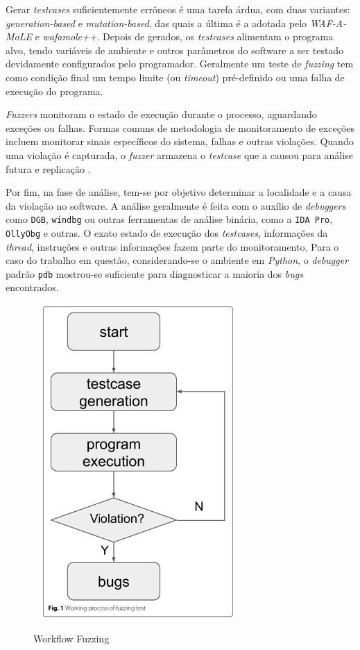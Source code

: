 Gerar \textit{testcases} suficientemente errôneos é uma tarefa árdua, com duas variantes: \textit{generation-based} e \textit{mutation-based}, das quais a última é a adotada pelo \textit{WAF-A-MoLE} e \textit{wafamole++}. Depois de gerados, os \textit{testcases} alimentam o programa alvo, tendo variáveis de ambiente e outros parâmetros do software a ser testado devidamente configurados pelo programador. Geralmente um teste de \textit{fuzzing} tem como condição final um tempo limite (ou \textit{timeout}) pré-definido ou uma falha de execução do programa.

\textit{Fuzzers} monitoram o estado de execução durante o processo, aguardando exceções ou falhas.  Formas comuns de metodologia de monitoramento de exceções incluem monitorar sinais específicos do sistema, falhas e outras violações. Quando uma violação é capturada, o \textit{fuzzer} armazena o \textit{testcase} que a causou para análise futura e replicação \cite{li2018fuzzing}.

Por fim, na fase de análise, tem-se por objetivo determinar a localidade e a causa da violação no software. A análise geralmente é feita com o auxílio de \textit{debuggers} como \verb+DGB+, \verb+windbg+ ou outras ferramentas de análise binária, como a \verb+IDA Pro+, \verb+OllyObg+ e outras. O exato estado de execução dos \textit{testcases}, informações da \textit{thread}, instruções e outras informações fazem parte do monitoramento. Para o caso do trabalho em questão, considerando-se o ambiente em \textit{Python}, o \textit{debugger} padrão \verb+pdb+ mostrou-se suficiente para diagnosticar a maioria dos \textit{bugs} encontrados.

\begin{figure}[ht]
    \centering
    \caption{Workflow Fuzzing}
    \includegraphics[width=8cm,height=12cm,keepaspectratio]{figuras/fuzzing imagem.png} 
    \label{fig:internet} 
\end{figure}

